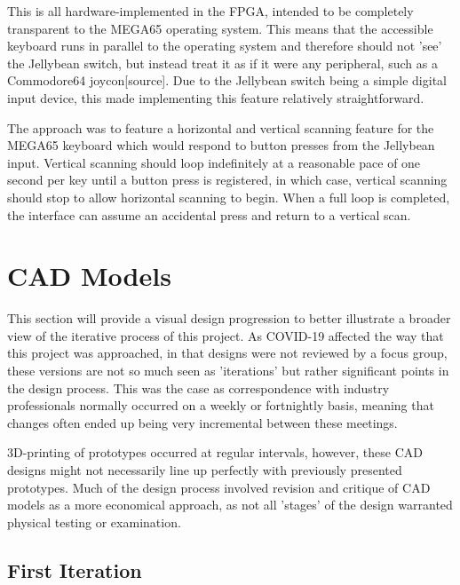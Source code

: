 This is all hardware-implemented in the FPGA, intended to be completely transparent to the MEGA65 operating system.
This means that the accessible keyboard runs in parallel to the operating system and therefore should not 'see' the Jellybean switch, but instead treat it as if it were any peripheral, such as a Commodore64 joycon[source].
Due to the Jellybean switch being a simple digital input device, this made implementing this feature relatively straightforward.

The approach was to feature a horizontal and vertical scanning feature for the MEGA65 keyboard which would respond to button presses from the Jellybean input.
Vertical scanning should loop indefinitely at a reasonable pace of one second per key until a button press is registered, in which case, vertical scanning should stop to allow horizontal scanning to begin.
When a full loop is completed, the interface can assume an accidental press and return to a vertical scan. %


\section{CAD Models}
This section will provide a visual design progression to better illustrate a broader view of the iterative process of this project.
As COVID-19 affected the way that this project was approached, in that designs were not reviewed by a focus group, these versions are not so much seen as 'iterations' but rather significant points in the design process.
This was the case as correspondence with industry professionals normally occurred on a weekly or fortnightly basis, meaning that changes often ended up being very incremental between these meetings.

3D-printing of prototypes occurred at regular intervals, however, these CAD designs might not necessarily line up perfectly with previously presented prototypes.
Much of the design process involved revision and critique of CAD models as a more economical approach, as not all 'stages' of the design warranted physical testing or examination.

\subsection{First Iteration}

